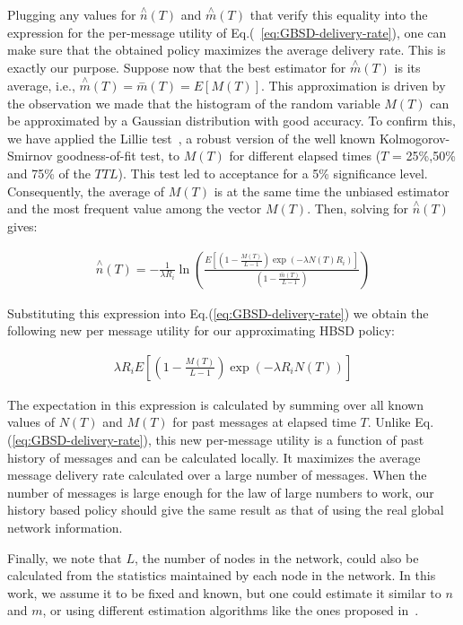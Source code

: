Plugging any values
for $\stackrel{\wedge}{n}(T)$ and $\stackrel{\wedge}{m}(T)$ that verify this equality into the expression for the per-message utility of Eq.(~\ref{eq:GBSD-delivery-rate}), one can make sure that the obtained policy maximizes the average delivery rate. This is exactly our purpose. Suppose now that the best estimator for $\stackrel{\wedge}{m}(T)$ is its average, i.e., $\stackrel{\wedge}{m}(T)=\stackrel{-}{m}(T)=E[M(T)]$. This approximation is driven by the observation we made that the
histogram of the random variable $M(T)$ can be  approximated by a Gaussian distribution with good accuracy. To confirm this, we have applied the Lillie test~\cite{LillieTest}, a robust version of the well known Kolmogorov-Smirnov goodness-of-fit test, to $M(T)$ for different elapsed times ($T$ = 25\%,50\% and 75\% of the $TTL$). This test led to acceptance for a 5\% significance level. Consequently, the average of $M(T)$ is at the same time the unbiased estimator and the most frequent value among the vector $M(T)$. Then, solving for $\stackrel{\wedge}{n}(T)$ gives:

\begin{align}
\stackrel{\wedge}{n}(T) = -\frac{1}{\lambda R_i}
\ln(\frac{E[(1-\frac{M(T)}{L-1})\exp(-\lambda N(T)
R_i)]}{(1-\frac{\stackrel{-}{m}(T)}{L-1})})
\end{align}

Substituting this expression into Eq.(\ref{eq:GBSD-delivery-rate}) we obtain the following new per message utility for our approximating HBSD policy:

\begin{align}
\label{HBSD-DR-U}
\lambda R_i E[(1-\frac{M(T)}{L-1})\exp( - \lambda R_i N(T))]
\end{align}

The expectation in this expression is calculated by summing over all known values of $N(T)$ and $M(T)$ for past messages at elapsed time $T$. Unlike Eq.(\ref{eq:GBSD-delivery-rate}), this new per-message utility is a function of past history of messages and can be calculated locally. It maximizes the average message delivery rate calculated over a large number of messages. When the number of messages is large enough for the law of large numbers to work, our history based policy should give the same result as that of using the real global network information.

Finally, we note that $L$, the number of nodes in the network, could also be calculated from the statistics maintained by each node in the network. In this work, we assume it to be fixed and known, but one could estimate it similar to $n$ and $m$, or using different estimation algorithms like the ones proposed in~\cite{PellegriniAOC2009}.

